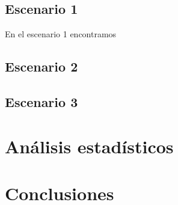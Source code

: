     \subsection{Escenario 1}
        En el escenario 1 encontramos
    \subsection{Escenario 2}
    \subsection{Escenario 3}
        
\section{Análisis estadísticos}
        
        
\section{Conclusiones}